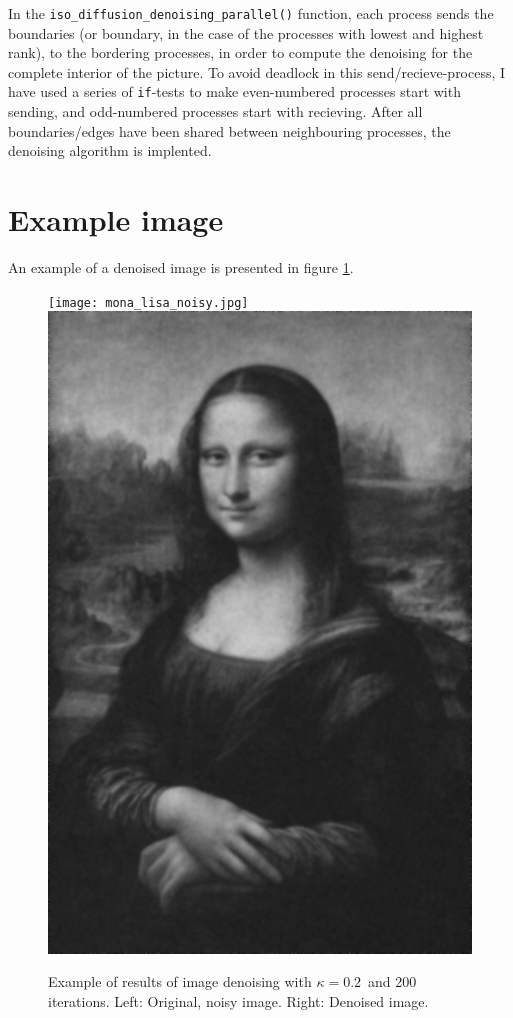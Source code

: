 \documentclass[10pt, a4paper]{amsart}
\numberwithin{figure}{section}
\numberwithin{table}{section}
\begin{document}
In the \texttt{iso\_diffusion\_denoising\_parallel()} function, each process sends the boundaries (or boundary, in the case of the processes with lowest and highest rank), to the bordering processes, in order to compute the denoising for the complete interior of the picture. To avoid deadlock in this send/recieve-process, I have used a series of \texttt{if}-tests to make even-numbered processes start with sending, and odd-numbered processes start with recieving. After all boundaries/edges have been shared between neighbouring processes, the denoising algorithm is implented.


\section{Example image}

An example of a denoised image is presented in figure \ref{fig:example}.

\begin{figure}
    \texttt{[image: mona\_lisa\_noisy.jpg]}
    \includegraphics[scale=0.03]{denoised_200.jpg}
    \caption{Example of results of image denoising with $\kappa=0.2$ and 200 iterations. Left: Original, noisy image. Right: Denoised image.}
    \label{fig:example}
\end{figure}
\end{document}
